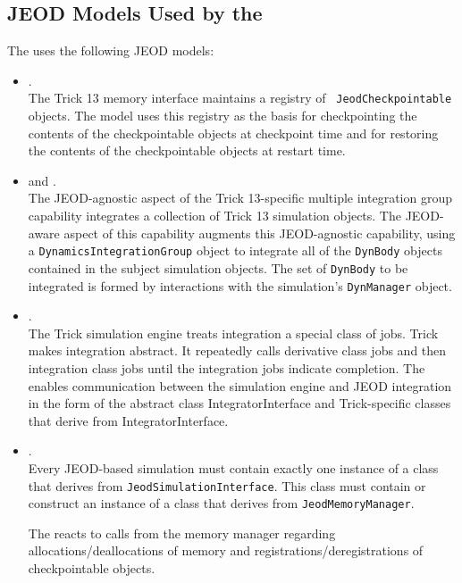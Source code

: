 \subsection{JEOD Models Used by the \ModelDesc}
The \ModelDesc uses the following JEOD models:
\begin{itemize}
\item{}.\\
The Trick 13 memory interface maintains a registry of
\CONTAINER\ \verb|JeodCheckpointable| objects.
The model uses this registry as the basis for
checkpointing the contents of the checkpointable objects at checkpoint time
and for restoring the contents of the checkpointable objects at restart time.

\item{} and .\\
The JEOD-agnostic aspect of the Trick 13-specific multiple integration group
capability integrates a collection of Trick 13 simulation objects.
The JEOD-aware aspect of this capability augments this JEOD-agnostic capability,
using a \verb|DynamicsIntegrationGroup| object to integrate all
of the \verb|DynBody| objects contained in the subject simulation objects.
The set of \verb|DynBody| to be integrated is formed by interactions with the
simulation's \verb|DynManager| object.

\item{}.\\
The Trick simulation engine treats integration a special class of jobs.
Trick makes integration abstract. It repeatedly calls derivative class jobs and
then integration class jobs until the integration jobs indicate completion.
The \ModelDesc enables communication between the simulation engine and
JEOD integration in the form of the abstract class IntegratorInterface and
Trick-specific classes that derive from IntegratorInterface.

\item{}.\\
Every JEOD-based simulation must contain exactly one instance of a class that
derives from \verb|JeodSimulationInterface|. This class must contain or
construct an instance of a class that derives from \verb|JeodMemoryManager|.

The \ModelDesc reacts to calls from the memory manager regarding
allocations/deallocations of memory and registrations/deregistrations
of checkpointable objects.


\end{itemize}
